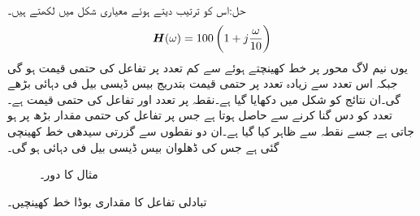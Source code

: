 حل:اس کو ترتیب دیتے ہوئے معیاری شکل میں لکھتے ہیں۔
\begin{align*}
{\ensuremath{{\boldsymbol{H}}}}(\omega)=100\left(1+j\frac{\omega}{10}\right)
\end{align*}
یوں نیم لاگ محور پر خط کھینچتے ہوئے  سے کم تعدد  پر تفاعل کی حتمی قیمت  ہو گی جبکہ اس تعدد سے زیادہ تعدد پر حتمی قیمت بتدریج بیس ڈیسی بیل فی دہائی بڑھے گی۔ان نتائج کو شکل  میں دکھایا گیا ہے۔نقطہ  پر تعدد  اور تفاعل کی حتمی قیمت  ہے۔تعدد کو دس گنا کرنے سے  حاصل ہوتا ہے جس پر تفاعل کی حتمی مقدار بڑھ پر  ہو جاتی ہے جسے نقطہ  سے ظاہر کیا گیا ہے۔ان دو نقطوں سے گزرتی سیدھی خط کھینچی گئی ہے جس کی ڈھلوان بیس ڈیسی بیل فی دہائی ہو گی۔
\begin{figure}
\centering
{}
\caption{مثال  کا دور۔}
\label{شکل_تعددی_ایک_قطب_دس_تعدد}
\end{figure}
تبادلی تفاعل  کا مقداری بوڈا خط کھینچیں۔

